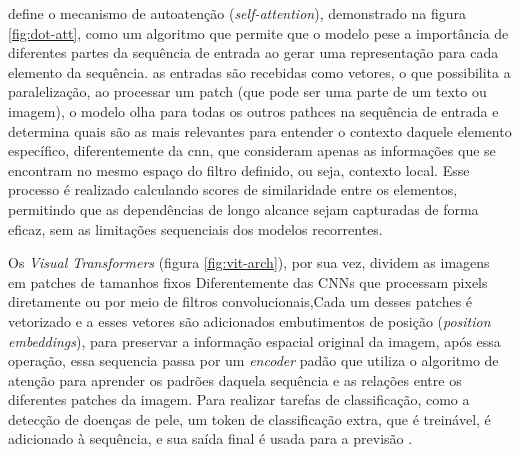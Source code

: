  define o mecanismo de autoatenção (\textit{self-attention}), demonstrado na figura \ref{fig:dot-att}, como um algoritmo que permite que o modelo pese a importância de diferentes partes da sequência de entrada ao gerar uma representação para cada elemento da sequência. as entradas são recebidas como vetores, o que possibilita a paralelização, ao processar um patch (que pode ser uma parte de um texto ou imagem), o modelo olha para todas os outros pathces na sequência de entrada e determina quais são as mais relevantes para entender o contexto daquele elemento específico, diferentemente da cnn, que consideram apenas as informações que se encontram no mesmo espaço do filtro definido, ou seja, contexto local. 
 Esse processo é realizado calculando scores de similaridade entre os elementos, permitindo que as dependências de longo alcance sejam capturadas de forma eficaz, sem as limitações sequenciais dos modelos recorrentes.

%

Os \textit{Visual Transformers} (figura \ref{fig:vit-arch}), por sua vez, dividem as imagens em patches de tamanhos fixos
Diferentemente das \acs{CNN}s que processam pixels diretamente ou por meio de filtros convolucionais,Cada um desses patches é vetorizado e a esses vetores são adicionados embutimentos de posição (\textit{position embeddings}), para preservar a informação espacial original da imagem, após essa operação, essa sequencia passa por um \textit{encoder} padão que utiliza o algoritmo de atenção para aprender os padrões daquela sequência e as relações entre os diferentes patches da imagem. Para realizar tarefas de classificação, como a detecção de doenças de pele, um token de classificação extra, que é treinável, é adicionado à sequência, e sua saída final é usada para a previsão \cite{Dosovitskiy}.
\newline
\newline
\newline

